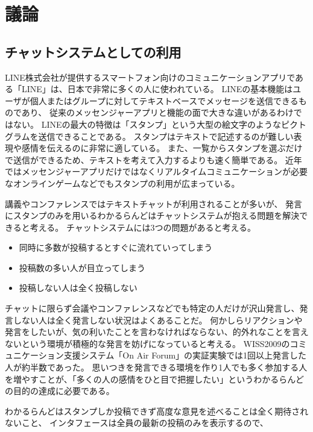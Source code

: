 \section{議論}

\subsection{チャットシステムとしての利用}

LINE株式会社が提供するスマートフォン向けのコミュニケーションアプリである「LINE」は、日本で非常に多くの人に使われている。
LINEの基本機能はユーザが個人またはグループに対してテキストベースでメッセージを送信できるものであり、
従来のメッセンジャーアプリと機能の面で大きな違いがあるわけではない。
LINEの最大の特徴は「スタンプ」という大型の絵文字のようなピクトグラムを送信できることである。
スタンプはテキストで記述するのが難しい表現や感情を伝えるのに非常に適している。
また、一覧からスタンプを選ぶだけで送信ができるため、テキストを考えて入力するよりも速く簡単である。
近年ではメッセンジャーアプリだけではなくリアルタイムコミュニケーションが必要なオンラインゲームなどでもスタンプの利用が広まっている。

講義やコンファレンスではテキストチャットが利用されることが多いが、
発言にスタンプのみを用いるわかるらんどはチャットシステムが抱える問題を解決できると考える。
チャットシステムには3つの問題があると考える。

\begin{itemize}
\item 同時に多数が投稿するとすぐに流れていってしまう
\item 投稿数の多い人が目立ってしまう
\item 投稿しない人は全く投稿しない
\end{itemize}

チャットに限らず会議やコンファレンスなどでも特定の人だけが沢山発言し、発言しない人は全く発言しない状況はよくあることだ。
何かしらリアクションや発言をしたいが、気の利いたことを言わなければならない、的外れなことを言えないという環境が積極的な発言を妨げになっていると考える。
WISS2009のコミュニケーション支援システム「On Air Forum」の実証実験\cite{nishida2011}では1回以上発言した人が約半数であった。
思いつきを発言できる環境を作り1人でも多く参加する人を増やすことが、「多くの人の感情をひと目で把握したい」というわかるらんどの目的の達成に必要である。

わかるらんどはスタンプしか投稿できず高度な意見を述べることは全く期待されないこと、
インタフェースは全員の最新の投稿のみを表示するので、


